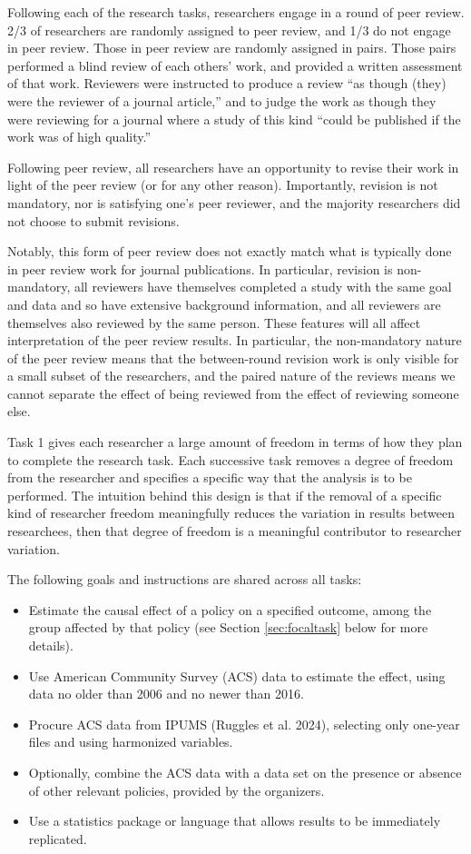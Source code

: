 \documentclass[
  letterpaper,
  DIV=11,
  numbers=noendperiod]{scrartcl}
\begin{document}
Following each of the research tasks, researchers engage in a round of
peer review. 2/3 of researchers are randomly assigned to peer review,
and 1/3 do not engage in peer review. Those in peer review are randomly
assigned in pairs. Those pairs performed a blind review of each others'
work, and provided a written assessment of that work. Reviewers were
instructed to produce a review ``as though (they) were the reviewer of a
journal article,'' and to judge the work as though they were reviewing
for a journal where a study of this kind ``could be published if the
work was of high quality.''

Following peer review, all researchers have an opportunity to revise
their work in light of the peer review (or for any other reason).
Importantly, revision is not mandatory, nor is satisfying one's peer
reviewer, and the majority researchers did not choose to submit
revisions.

Notably, this form of peer review does not exactly match what is
typically done in peer review work for journal publications. In
particular, revision is non-mandatory, all reviewers have themselves
completed a study with the same goal and data and so have extensive
background information, and all reviewers are themselves also reviewed
by the same person. These features will all affect interpretation of the
peer review results. In particular, the non-mandatory nature of the peer
review means that the between-round revision work is only visible for a
small subset of the researchers, and the paired nature of the reviews
means we cannot separate the effect of being reviewed from the effect of
reviewing someone else.

Task 1 gives each researcher a large amount of freedom in terms of how
they plan to complete the research task. Each successive task removes a
degree of freedom from the researcher and specifies a specific way that
the analysis is to be performed. The intuition behind this design is
that if the removal of a specific kind of researcher freedom
meaningfully reduces the variation in results between researchees, then
that degree of freedom is a meaningful contributor to researcher
variation.

The following goals and instructions are shared across all tasks:

\begin{itemize}
\item
  Estimate the causal effect of a policy on a specified outcome, among
  the group affected by that policy (see Section \ref{sec:focaltask}
  below for more details).
\item
  Use American Community Survey (ACS) data to estimate the effect, using
  data no older than 2006 and no newer than 2016.
\item
  Procure ACS data from IPUMS (Ruggles et al. 2024), selecting only
  one-year files and using harmonized variables.
\item
  Optionally, combine the ACS data with a data set on the presence or
  absence of other relevant policies, provided by the organizers.
\item
  Use a statistics package or language that allows results to be
  immediately replicated.
\end{itemize}
\end{document}
